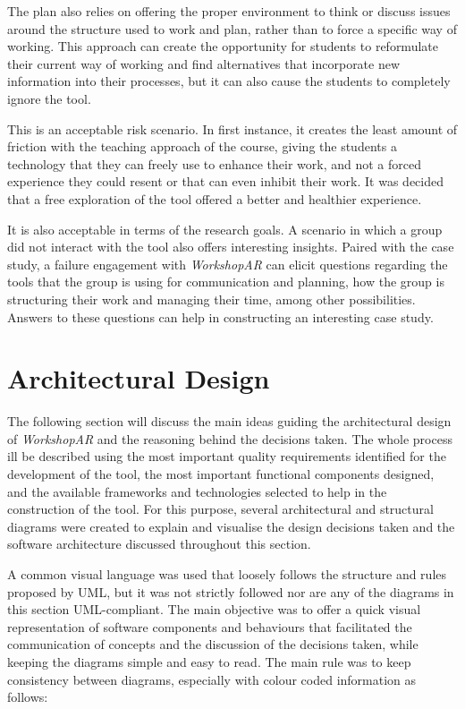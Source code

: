 The plan also relies on offering the proper environment to think or discuss issues around the structure used to work and plan, rather than to force a specific way of
working. This approach can create the opportunity for students to reformulate their current way of working and find alternatives that incorporate new information into
their processes, but it can also cause the students to completely ignore the tool.

This is an acceptable risk scenario. In first instance, it creates the least amount of friction with the teaching approach of the course, giving the students a technology
that they can freely use to enhance their work, and not a forced experience they could resent or that can even inhibit their work. It was decided that a free exploration
of the tool offered a better and healthier experience.

It is also acceptable in terms of the research goals. A scenario in which a group did not interact with the tool also offers interesting insights. Paired with the case
study, a failure engagement with \emph{WorkshopAR} can elicit questions regarding the tools that the group is using for communication and planning, how the group is
structuring their work and managing their time, among other possibilities. Answers to these questions can help in constructing an interesting case study.

\section{Architectural Design \label{sec:4-3}}

The following section will discuss the main ideas guiding the architectural design of \emph{WorkshopAR} and the reasoning behind the decisions taken. The whole process 
ill be described using the most important quality requirements identified for the development of the tool, the most important functional components designed, and the
available frameworks and technologies selected to help in the construction of the tool. For this purpose, several architectural and structural diagrams were created to
explain and visualise the design decisions taken and the software architecture discussed throughout this section.

A common visual language was used that loosely follows the structure and rules proposed by UML, but it was not strictly followed nor are any of the diagrams in this
section UML-compliant. The main objective was to offer a quick visual representation of software components and behaviours that facilitated the communication of concepts
and the discussion of the decisions taken, while keeping the diagrams simple and easy to read. The main rule was to keep consistency between diagrams, especially with
colour coded information as follows:

